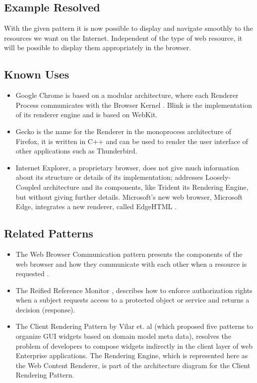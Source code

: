 \documentclass[]{acmlarge}
\begin{document}
  \subsection*{Example Resolved}
With the given pattern it is now possible to display and navigate smoothly to the resources we want on the Internet. Independent of the type of web resource, it will be possible to display them appropriately in the browser. 
  \subsection*{Known Uses}
  \begin{itemize}\leftskip0.2em
    \item Google Chrome is based on a modular architecture, where each Renderer Process communicates with the Browser Kernel \cite{multiProcGC}. Blink is the implementation of its renderer engine and is based on WebKit.
    \item Gecko \cite{gecko2} is the name for the Renderer in the monoprocess architecture of Firefox, it is written in C++ and can be used to render the user interface of other applications such as Thunderbird.
    \item Internet Explorer, a proprietary browser, does not give much information about its structure or details of its implementation; \cite{Crowley2010} addresses Loosely-Coupled architecture \cite{IE8-LCIE} and its components, like Trident its Rendering Engine, but without giving further details. Microsoft's new web browser, Microsoft Edge, integrates a new renderer, called EdgeHTML \cite{edgehtml}.
  \end{itemize}

  \subsection*{Related Patterns}
  \begin{itemize}\leftskip0.2em
    \item The Web Browser Communication pattern presents the components of the web browser and how they communicate with each other when a resource is requested \cite{silva2015}. 
    \item The Reified Reference Monitor \cite{fernandez2013security}, describes how to enforce authorization rights when a subject requests access to a protected object or service and returns a decision (response). 
    \item The Client Rendering Pattern by Vilar et. al \cite{Vilar2015} (which proposed five patterns to organize GUI widgets based on domain model meta data), resolves the problem of developers to compose widgets indirectly in the client layer of web Enterprise applications. The Rendering Engine, which is represented here as the Web Content Renderer, is part of the architecture diagram for the Client Rendering Pattern.
  \end{itemize}
\end{document}
